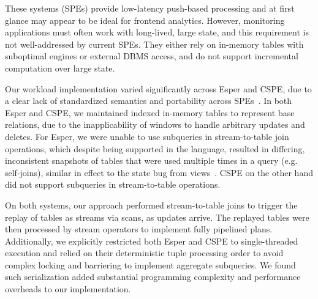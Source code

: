 \vspace{1mm}
These systems (SPEs) provide low-latency push-based processing and at first
glance may appear to be ideal for frontend analytics.
However, monitoring applications must often work with long-lived, large state,
and this requirement is not well-addressed by current SPEs. They either rely on
in-memory tables with suboptimal engines or external DBMS access, and do not
support incremental computation over large state.

Our workload implementation varied significantly across Esper and CSPE, due to a
clear lack of standardized semantics and portability across
SPEs~\cite{botan-pvldb:10,jain-pvldb:08}.
In both Esper and CSPE, we maintained indexed in-memory tables to represent base
relations, due to the inapplicability of windows to handle arbitrary updates and
deletes.
For Esper, we were unable to use subqueries in stream-to-table join operations,
which despite being supported in the language, resulted in differing,
inconsistent snapshots of tables that were used multiple times in a query (e.g.
self-joins), similar in effect to the state bug from
views~\cite{colby-sigmod:96}.
CSPE on the other hand did not support subqueries in stream-to-table operations.

On both systems, our approach performed stream-to-table joins to trigger the
replay of tables as streams via scans, as updates arrive. The replayed tables
were then processed by stream operators to implement fully pipelined plans.
Additionally, we explicitly restricted both Esper and CSPE to single-threaded
execution and relied on their deterministic tuple processing order to avoid
complex locking and barriering to implement aggregate subqueries. We found such
serialization added substantial programming complexity and performance overheads
to our implementation.

